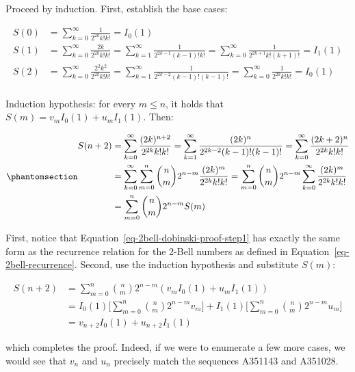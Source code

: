 \documentclass[
  letterpaper,
  DIV=11,
  numbers=noendperiod]{scrartcl}
\theoremstyle{plain}
\theoremstyle{remark}
\begin{document}
\label{.proof}
Proceed by induction. First, establish the base cases:

\[
\begin{aligned}
S(0) &= \sum_{k=0}^{\infty} \frac{1}{2^{2k}k!k!} = I_0(1) \\
S(1) &= \sum_{k=0}^{\infty} \frac{2k}{2^{2k}k!k!} = \sum_{k=1}^{\infty} \frac{1}{2^{2k-1}(k-1)!k!} = \sum_{k=0}^{\infty} \frac{1}{2^{2k+1}k!(k+1)!} = I_1(1)\\
S(2) &= \sum_{k=0}^{\infty} \frac{2^2k^2}{2^{2k}k!k!} = \sum_{k=1}^{\infty} \frac{1}{2^{2k-2}(k-1)!(k-1)!} = \sum_{k=0}^{\infty} \frac{1}{2^{2k}k!k!} = I_0(1)\\
\end{aligned}
\]

Induction hypothesis: for every \(m \leq n\), it holds that
\(S(m) = v_m I_0(1) + u_m I_1(1)\). Then:

\begin{equation}\phantomsection\label{eq-2bell-dobinski-proof-step1}{
\begin{aligned}
S(n+2) &= \sum_{k=0}^{\infty} \frac{(2k)^{n+2}}{2^{2k}k!k!} = \sum_{k=1}^{\infty} \frac{(2k)^{n}}{2^{2k-2}(k-1)!(k-1)!} = \sum_{k=0}^{\infty} \frac{(2k+2)^{n}}{2^{2k}k!k!}\\
&= \sum_{k=0}^{\infty}\sum_{m=0}^{n} \binom{n}{m}2^{n-m}\frac{(2k)^m}{2^{2k}k!k!} = \sum_{m=0}^{n}\binom{n}{m}2^{n-m} \sum_{k=0}^{\infty}\frac{(2k)^m}{2^{2k}k!k!} \\
&= \sum_{m=0}^{n}\binom{n}{m}2^{n-m} S(m)
\end{aligned}
}\end{equation}

First, notice that Equation~\ref{eq-2bell-dobinski-proof-step1} has
exactly the same form as the recurrence relation for the 2-Bell numbers
as defined in Equation~\ref{eq-2bell-recurrence}. Second, use the
induction hypothesis and substitute \(S(m)\):

\[
\begin{aligned}
S(n+2) &= \sum_{m=0}^{n}\binom{n}{m}2^{n-m} (v_m I_0(1)+u_m I_1(1)) \\
&= I_0(1)\bigg[\sum_{m=0}^{n}\binom{n}{m}2^{n-m}v_m\bigg] + I_1(1)\bigg[\sum_{m=0}^{n}\binom{n}{m}2^{n-m}u_m\bigg] \\
&= v_{n+2}I_0(1)+u_{n+2}I_1(1)
\end{aligned}
\]

which completes the proof. Indeed, if we were to enumerate a few more
cases, we would see that \(v_n\) and \(u_n\) precisely match the
sequences A351143 and A351028.
\end{document}

